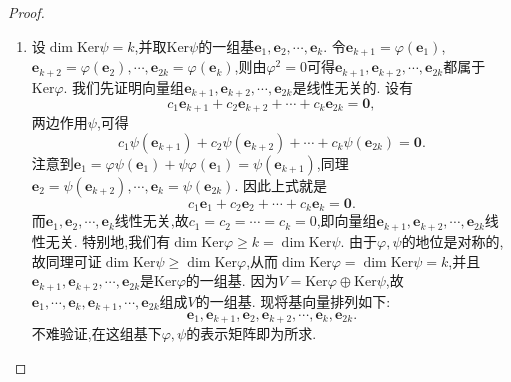 \documentclass[../../main.tex]{subfiles}%
\begin{document}
\begin{proof}
\begin{enumerate}[(1)]
\item 设\(\dim\text{Ker}\psi=k\),并取\(\text{Ker}\psi\)的一组基\(\boldsymbol{e}_1,\boldsymbol{e}_2,\cdots,\boldsymbol{e}_k\). 令\(\boldsymbol{e}_{k + 1}=\varphi(\boldsymbol{e}_1)\),\(\boldsymbol{e}_{k + 2}=\varphi(\boldsymbol{e}_2),\cdots,\boldsymbol{e}_{2k}=\varphi(\boldsymbol{e}_k)\),则由\(\varphi^2 = 0\)可得\(\boldsymbol{e}_{k + 1},\boldsymbol{e}_{k + 2},\cdots,\boldsymbol{e}_{2k}\)都属于\(\text{Ker}\varphi\). 我们先证明向量组\(\boldsymbol{e}_{k + 1},\boldsymbol{e}_{k + 2},\cdots,\boldsymbol{e}_{2k}\)是线性无关的. 设有
\[
c_1\boldsymbol{e}_{k + 1}+c_2\boldsymbol{e}_{k + 2}+\cdots + c_k\boldsymbol{e}_{2k}=\boldsymbol{0},
\]
两边作用\(\psi\),可得
\[
c_1\psi(\boldsymbol{e}_{k + 1})+c_2\psi(\boldsymbol{e}_{k + 2})+\cdots + c_k\psi(\boldsymbol{e}_{2k})=\boldsymbol{0}.
\]
注意到\(\boldsymbol{e}_1=\varphi\psi(\boldsymbol{e}_1)+\psi\varphi(\boldsymbol{e}_1)=\psi(\boldsymbol{e}_{k + 1})\),同理\(\boldsymbol{e}_2=\psi(\boldsymbol{e}_{k + 2}),\cdots,\boldsymbol{e}_k=\psi(\boldsymbol{e}_{2k})\). 因此上式就是
\[
c_1\boldsymbol{e}_1+c_2\boldsymbol{e}_2+\cdots + c_k\boldsymbol{e}_k=\boldsymbol{0}.
\]
而\(\boldsymbol{e}_1,\boldsymbol{e}_2,\cdots,\boldsymbol{e}_k\)线性无关,故\(c_1 = c_2=\cdots = c_k = 0\),即向量组\(\boldsymbol{e}_{k + 1},\boldsymbol{e}_{k + 2},\cdots,\boldsymbol{e}_{2k}\)线性无关. 特别地,我们有\(\dim\text{Ker}\varphi\geqslant  k=\dim\text{Ker}\psi\). 由于\(\varphi,\psi\)的地位是对称的,故同理可证\(\dim\text{Ker}\psi\geqslant \dim\text{Ker}\varphi\),从而\(\dim\text{Ker}\varphi=\dim\text{Ker}\psi = k\),并且\(\boldsymbol{e}_{k + 1},\boldsymbol{e}_{k + 2},\cdots,\boldsymbol{e}_{2k}\)是\(\text{Ker}\varphi\)的一组基. 因为\(V=\text{Ker}\varphi\oplus\text{Ker}\psi\),故\(\boldsymbol{e}_1,\cdots,\boldsymbol{e}_k,\boldsymbol{e}_{k + 1},\cdots,\boldsymbol{e}_{2k}\)组成\(V\)的一组基. 现将基向量排列如下:
\[
\boldsymbol{e}_1,\boldsymbol{e}_{k + 1},\boldsymbol{e}_2,\boldsymbol{e}_{k + 2},\cdots,\boldsymbol{e}_k,\boldsymbol{e}_{2k}.
\]
不难验证,在这组基下\(\varphi,\psi\)的表示矩阵即为所求.
\end{enumerate}
\end{proof}
\end{document}
